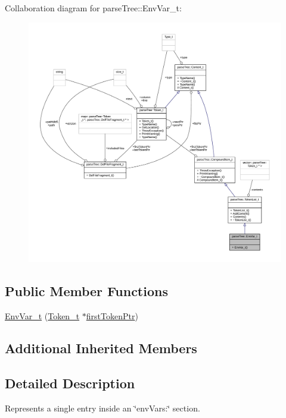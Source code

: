 Collaboration diagram for parse\+Tree\+:\+:Env\+Var\+\_\+t\+:
\nopagebreak
\begin{figure}[H]
\begin{center}
\leavevmode
\includegraphics[width=350pt]{structparse_tree_1_1_env_var__t__coll__graph}
\end{center}
\end{figure}
\subsection*{Public Member Functions}
\begin{DoxyCompactItemize}
\item 
\hyperlink{structparse_tree_1_1_env_var__t_a1c7c761f843f92896b90d2addd91829b}{Env\+Var\+\_\+t} (\hyperlink{structparse_tree_1_1_token__t}{Token\+\_\+t} $\ast$\hyperlink{structparse_tree_1_1_compound_item__t_a587020c943e760cb0152dd8cd31e21ef}{first\+Token\+Ptr})
\end{DoxyCompactItemize}
\subsection*{Additional Inherited Members}


\subsection{Detailed Description}
Represents a single entry inside an \char`\"{}env\+Vars\+:\char`\"{} section. 

